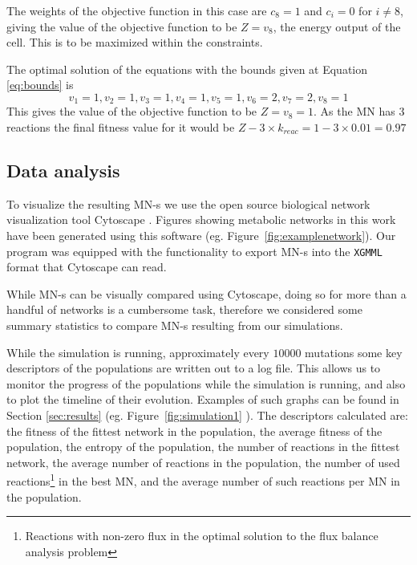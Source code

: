 \documentclass[a4paper,12pt]{article}
\begin{document}
	The weights of the objective function in this case are $c_8=1$ and $c_i=0$ for $i\neq 8$, giving the value of the objective function to be $Z=v_8$, the energy output of the cell. This is to be maximized within the constraints.

	The optimal solution of the equations with the bounds given at Equation \ref{eq:bounds} is 
	\begin{equation}\label{eq:solution}
		v_1=1 , v_2=1, v_3=1, v_4=1, v_5=1, v_6=2, v_7=2, v_8=1
	\end{equation}
	This gives the value of the objective function to be $Z=v_8=1$. As the MN has $3$ reactions the final fitness value for it would be $Z-3\times k_{reac}=1-3\times 0.01=0.97$
\subsection{Data analysis}
\label{sub:visualization}

To visualize the resulting MN-s we use the open source biological network visualization tool Cytoscape \cite{cytoscape}. Figures showing metabolic networks in this work have been generated using this software (eg. Figure~\ref{fig:examplenetwork}). Our program was equipped with the functionality to export MN-s into the \texttt{XGMML} format that Cytoscape can read. 

While MN-s can be visually compared using Cytoscape, doing so for more than a handful of networks is a cumbersome task, therefore we considered some summary statistics to compare MN-s resulting from our simulations.

While the simulation is running, approximately every $10000$ mutations some key descriptors of the populations are written out to a log file. This allows us to monitor the progress of the populations while the simulation is running, and also to plot the timeline of their evolution. Examples of such graphs can be found in Section \ref{sec:results} (eg. Figure~\ref{fig:simulation1} ). The descriptors calculated are: the fitness of the fittest network in the population, the average fitness of the population, the entropy of the population, the number of reactions in the fittest network, the average number of reactions in the population, the number of used reactions\footnote{Reactions with non-zero flux in the optimal solution to the flux balance analysis problem} in the best MN, and the average number of such reactions per MN in the population. 
\end{document}
